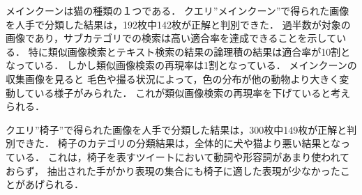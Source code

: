 メインクーンは猫の種類の１つである．
クエリ''メインクーン''で得られた画像を人手で分類した結果は，192枚中142枚が正解と判別できた．
過半数が対象の画像であり，サブカテゴリでの検索は高い適合率を達成できることを示している．
特に類似画像検索とテキスト検索の結果の論理積の結果は適合率が10割となっている．
しかし類似画像検索の再現率は1割となっている．
メインクーンの収集画像を見ると
毛色や撮る状況によって，色の分布が他の動物より大きく変動している様子がみられた．
これが類似画像検索の再現率を下げていると考えられる．


クエリ''椅子''で得られた画像を人手で分類した結果は，300枚中149枚が正解と判別できた．
椅子のカテゴリの分類結果は，全体的に犬や猫より悪い結果となっている．
これは，椅子を表すツイートにおいて動詞や形容詞があまり使われておらず，
抽出された手がかり表現の集合にも椅子に適した表現が少なかったことがあげられる．







